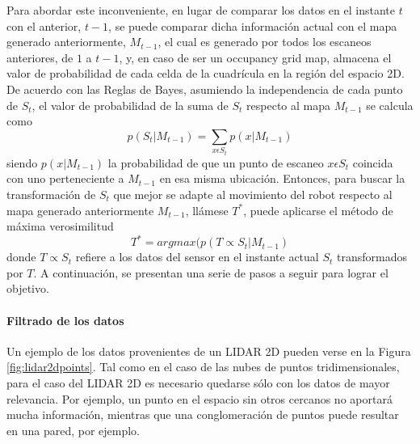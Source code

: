 Para abordar este inconveniente, en lugar de comparar los datos en el instante $t$ con el anterior, $t - 1$, se puede comparar dicha información actual con el mapa generado anteriormente, $M_{t-1}$, el cual es generado por todos los escaneos anteriores, de $1$ a $t-1$, y, en caso de ser un occupancy grid map, almacena el valor de probabilidad de cada celda de la cuadrícula en la región del espacio 2D. De acuerdo con las Reglas de Bayes, asumiendo la independencia de cada punto de $S_t$, el valor de probabilidad de la suma de $S_t$ respecto al mapa $M_{t-1}$ se calcula como \cite{qian2019}
\begin{equation}
    p(S_t|M_{t-1}) = \sum_{x\epsilon S_t} p(x|M_{t-1})
\end{equation}
siendo $p(x|M_{t-1})$ la probabilidad de que un punto de escaneo $x \epsilon S_t$ coincida con uno perteneciente a $M_{t-1}$ en esa misma ubicación. Entonces, para buscar la transformación de $S_t$ que mejor se adapte al movimiento del robot respecto al mapa generado anteriormente $M_{t-1}$, llámese $T^*$, puede aplicarse el método de máxima verosimilitud
\begin{equation}
    T^* = argmax(p(T\propto S_t|M_{t-1})
\end{equation}
donde $T\propto S_t$ refiere a los datos del sensor en el instante actual $S_t$ transformados por $T$. A continuación, se presentan una serie de pasos a seguir para lograr el objetivo.

\paragraph{Filtrado de los datos}
Un ejemplo de los datos provenientes de un LIDAR 2D pueden verse en la Figura \ref{fig:lidar2dpoints}. Tal como en el caso de las nubes de puntos tridimensionales, para el caso del LIDAR 2D es necesario quedarse sólo con los datos de mayor relevancia. Por ejemplo, un punto en el espacio sin otros cercanos no aportará mucha información, mientras que una conglomeración de puntos puede resultar en una pared, por ejemplo.

